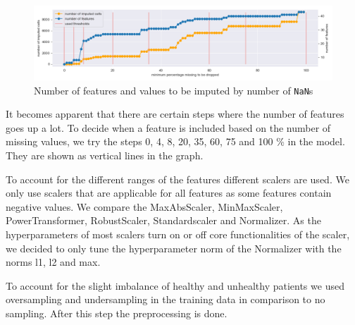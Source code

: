 \begin{figure}[h]
	\centering
	\includegraphics[width=\textwidth]{images/percentageToBeDropped.png}
	\caption{Number of features and values to be imputed by number of \texttt{NaN}s}
	\label{fig:percentageToBeDropped}
\end{figure}

It becomes apparent that there are certain steps where the number of features goes up a lot. To decide when a feature is included based on the number of missing values, we try the steps 0, 4, 8, 20, 35, 60, 75 and 100 \% in the model. They are shown as vertical lines in the graph. 

To account for the different ranges of the features different scalers are used. We only use scalers that are applicable for all features as some features contain negative values.
We compare the MaxAbsScaler, MinMaxScaler, PowerTransformer, RobustScaler, Standardscaler and Normalizer. As the hyperparameters of most scalers turn on or off core functionalities of the scaler, we decided to only tune the hyperparameter norm of the Normalizer with the norms l1, l2 and max.

To account for the slight imbalance of healthy and unhealthy patients we used oversampling and undersampling in the training data in comparison to no sampling. After this step the preprocessing is done. 


